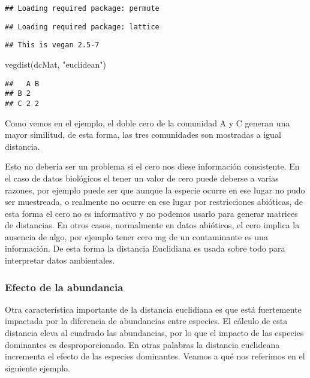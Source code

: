 \documentclass[
]{article}
\newenvironment{Shaded}{\begin{snugshade}}{\end{snugshade}}
\newcommand{\FunctionTok}[1]{\textcolor[rgb]{0.00,0.00,0.00}{#1}}
\newcommand{\NormalTok}[1]{#1}
\newcommand{\StringTok}[1]{\textcolor[rgb]{0.31,0.60,0.02}{#1}}
\begin{document}
\begin{verbatim}
## Loading required package: permute
\end{verbatim}

\begin{verbatim}
## Loading required package: lattice
\end{verbatim}

\begin{verbatim}
## This is vegan 2.5-7
\end{verbatim}

\begin{Shaded}
\begin{Highlighting}[]
\FunctionTok{vegdist}\NormalTok{(dcMat, }\StringTok{"euclidean"}\NormalTok{)}
\end{Highlighting}
\end{Shaded}

\begin{verbatim}
##   A B
## B 2  
## C 2 2
\end{verbatim}

Como vemos en el ejemplo, el doble cero de la comunidad A y C generan una mayor similitud, de esta forma, las tres comunidades son mostradas a igual distancia.

Esto no debería ser un problema si el cero nos diese información consistente. En el caso de datos biológicos el tener un valor de cero puede deberse a varias razones, por ejemplo puede ser que aunque la especie ocurre en ese lugar no pudo ser muestreada, o realmente no ocurre en ese lugar por restricciones abióticas, de esta forma el cero no es informativo y no podemos usarlo para generar matrices de distancias. En otros casos, normalmente en datos abióticos, el cero implica la ausencia de algo, por ejemplo tener cero mg de un contaminante es una información. De esta forma la distancia Euclidiana es usada sobre todo para interpretar datos ambientales.

\hypertarget{efecto-de-la-abundancia}{%
\subsubsection{Efecto de la abundancia}\label{efecto-de-la-abundancia}}

Otra característica importante de la distancia euclidiana es que está fuertemente impactada por la diferencia de abundancias entre especies. El cálculo de esta distancia eleva al cuadrado las abundancias, por lo que el impacto de las especies dominantes es desproporcionado. En otras palabras la distancia euclideana incrementa el efecto de las especies dominantes. Veamos a qué nos referimos en el siguiente ejemplo.
\end{document}
